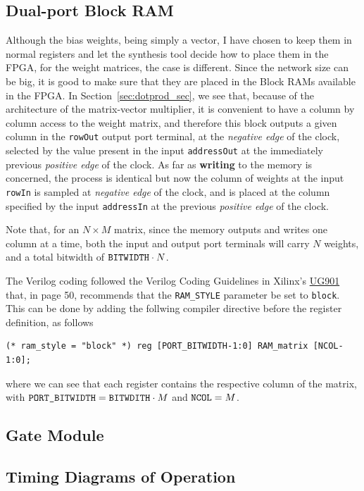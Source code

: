 \subsection{Dual-port Block RAM}
Although the bias weights, being simply a vector, I have chosen to keep them in normal registers and let the synthesis tool decide how to place them in the FPGA, for the weight matrices, the case is different. Since the
network size can be big, it is good to make sure that they are placed in the Block RAMs available in the FPGA. In Section~\ref{sec:dotprod_sec}, we see that, because of the architecture of the matrix-vector multiplier, it is convenient to have a column by column access to the weight matrix, and therefore this block outputs a given column in the \verb+rowOut+ output port terminal, at the \emph{negative edge} of the clock, selected by the value present in the input \verb+addressOut+ at the immediately previous \emph{positive edge} of the clock. As far as \textbf{writing} to the memory is concerned, the process is identical but now the column of weights at the input \verb+rowIn+ is sampled at \emph{negative edge} of the clock, and is placed at the column specified by the input \verb+addressIn+ at the previous \emph{positive edge} of the clock. 

Note that, for an $N \times M$ matrix, since the memory outputs and writes one column at a time, both the input and output port terminals will carry $N$ weights, and a total bitwidth of $\verb+BITWIDTH+ \cdot N$. 

The Verilog coding followed the Verilog Coding Guidelines in Xilinx's \href{http://www.xilinx.com/support/documentation/sw_manuals/xilinx2015_2/ug901-vivado-synthesis.pdf}{UG901} that, in page 50, recommends that the \verb+RAM_STYLE+ parameter be set to \verb+block+. This can be done by adding the follwing compiler directive before the register definition, as follows

\begin{verbatim}
(* ram_style = "block" *) reg [PORT_BITWIDTH-1:0] RAM_matrix [NCOL-1:0];
\end{verbatim}
where we can see that each register contains the respective column of the matrix, with $\verb+PORT_BITWIDTH+ = \verb+BITWDITH+ \cdot M$ and $\verb+NCOL+ = M$.
 

\subsection{Gate Module}

\subsection{Timing Diagrams of Operation}
